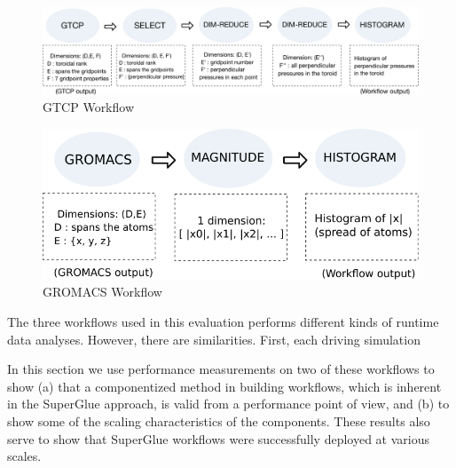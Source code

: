 \begin{figure}
  \includegraphics[width=\linewidth]{fig/wflow4}
  \vspace{-0.35in}
  \caption{GTCP Workflow}
  \label{fig:gtcp-workflow}
  \vspace{-0.15in}
\end{figure}

\begin{figure}
  \center
  \includegraphics[width=\columnwidth]{fig/wflow_gromacs}
  \vspace{-0.25in}
  \caption{GROMACS Workflow}
  \label{fig:gromacs-workflow}
  \vspace{-0.15in}
\end{figure}


The three \sys workflows used in this evaluation performs
different kinds of runtime data analyses.
However, there are similarities.
First, each driving simulation 


In this section we use
performance measurements on two of these workflows
to show (a) that a componentized method in
building workflows, which is inherent in the SuperGlue approach,
is valid from a performance point of view,
and (b) to show some of the scaling characteristics
of the components.
These results also serve to show that
SuperGlue workflows were successfully
deployed at various
scales.

